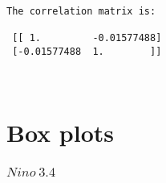 \documentclass[11pt]{article}
\begin{document}
    \begin{Verbatim}[commandchars=\\\{\}]
The correlation matrix is:

 [[ 1.         -0.01577488]
 [-0.01577488  1.        ]]

    \end{Verbatim}

    \begin{center}
    \end{center}
    { \hspace*{\fill} \\}
    
    \section{Box plots}\label{box-plots}

    \subsubsection{\texorpdfstring{\(Nino \  3.4\)}{Nino \textbackslash{}  3.4}}\label{nino-3.4}
\end{document}
